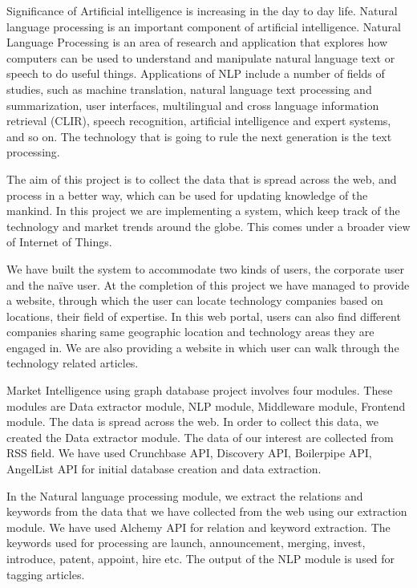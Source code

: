 \par
Significance of Artificial intelligence is increasing in the day to day life. Natural language processing is an important component of artificial intelligence. Natural Language Processing is an area of research and application that explores how computers can be used to understand and manipulate natural language text or speech to do useful things. Applications of NLP include a number of fields of studies, such as machine translation, natural language text processing and summarization, user interfaces, multilingual and cross language information retrieval (CLIR), speech recognition, artificial intelligence and expert systems, and so on. The technology that is going to rule the next generation is the text processing.
\par
The aim of this project is to collect the data that is spread across the web, and process in a better way, which can be used for updating knowledge of the mankind. In this project we are implementing a system, which keep track of the technology and market trends around the globe.
This comes under a broader view of Internet of Things. 
\par
We have built the system to accommodate two kinds of users, the corporate user and the naïve user. At the completion of this project we have managed to provide a website, through which the user can locate technology companies based on locations, their field of expertise. In this web portal, users can also find different companies sharing same geographic location and technology areas they are engaged in. We are also providing a website in which user can walk through the technology related articles.
\par
Market Intelligence using graph database project involves four modules. These modules are Data extractor module, NLP module, Middleware module, Frontend module. The data is spread across the web. In order to collect this data, we created the Data extractor module. The data of our interest are collected from RSS field. We have used Crunchbase API, Discovery API, Boilerpipe API, AngelList API for initial database creation and data extraction.
\par
In the Natural language processing module, we extract the relations and keywords from the data that we have collected from the web using our extraction module. We have used Alchemy API for relation and keyword extraction. The keywords used for processing are launch, announcement, merging, invest, introduce, patent, appoint, hire etc. The output of the NLP module is used for tagging articles.
